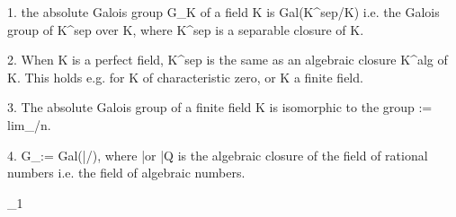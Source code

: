 
1. the absolute Galois group G_K of a field K is Gal(K^sep/K) 
i.e. the Galois group of K^sep over K, where K^sep is a separable closure of K.

2. When K is a perfect field, K^sep is the same as an algebraic closure K^alg of K. 
This holds e.g. for K of characteristic zero, or K a finite field. 

3. The absolute Galois group of a finite field K is isomorphic to the group
 := lim_\larr {}/n. 

4. G_\Q := Gal(\bar\Q/\Q), where \bar\Q or \bar Q is the algebraic closure of 
the field of rational numbers i.e. the field of algebraic numbers.

\F_1

